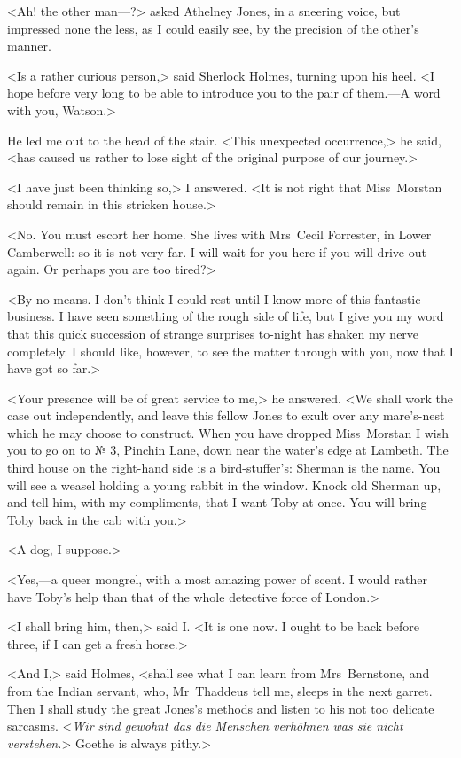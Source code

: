 <Ah! the other man—?> asked Athelney Jones, in a sneering voice, but impressed none the less, as I could easily see, by the precision of the other's manner.

<Is a rather curious person,> said Sherlock Holmes, turning upon his heel. <I hope before very long to be able to introduce you to the pair of them.—A word with you, Watson.>

He led me out to the head of the stair. <This unexpected occurrence,> he said, <has caused us rather to lose sight of the original purpose of our journey.>

<I have just been thinking so,> I answered. <It is not right that Miss~Morstan should remain in this stricken house.>

<No. You must escort her home. She lives with Mrs~Cecil Forrester, in Lower Camberwell: so it is not very far. I will wait for you here if you will drive out again. Or perhaps you are too tired?>

<By no means. I don't think I could rest until I know more of this fantastic business. I have seen something of the rough side of life, but I give you my word that this quick succession of strange surprises to-night has shaken my nerve completely. I should like, however, to see the matter through with you, now that I have got so far.>

<Your presence will be of great service to me,> he answered. <We shall work the case out independently, and leave this fellow Jones to exult over any mare's-nest which he may choose to construct. When you have dropped Miss~Morstan I wish you to go on to № 3, Pinchin Lane, down near the water's edge at Lambeth. The third house on the right-hand side is a bird-stuffer's: Sherman is the name. You will see a weasel holding a young rabbit in the window. Knock old Sherman up, and tell him, with my compliments, that I want Toby at once. You will bring Toby back in the cab with you.>

<A dog, I suppose.>

<Yes,—a queer mongrel, with a most amazing power of scent. I would rather have Toby's help than that of the whole detective force of London.>

<I shall bring him, then,> said I\@. <It is one now. I ought to be back before three, if I can get a fresh horse.>

<And I,> said Holmes, <shall see what I can learn from Mrs~Bernstone, and from the Indian servant, who, Mr~Thaddeus tell me, sleeps in the next garret. Then I shall study the great Jones's methods and listen to his not too delicate sarcasms. <\textit{\textgerman{Wir sind gewohnt das die Menschen verhöhnen was sie nicht verstehen.}}> Goethe is always pithy.>